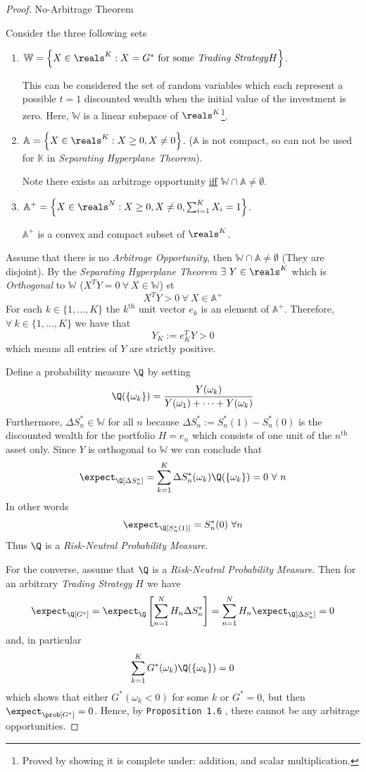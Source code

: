 \documentclass[11pt,a4paper]{article}
\begin{document}
  \begin{proof}{No-Arbitrage Theorem}
    \par Consider the three following sets
    \begin{enumerate}
      \item $\mathbb{W}=\left\{X\in\reals^K:X=G^*\text{ for some \textit{Trading Strategy}}H\right\}$.
      \par This can be considered the set of random variables which each represent a possible $t=1$ discounted wealth when the initial value of the investment is zero. Here, $\mathbb{W}$ is a linear subspace of $\reals^K$\footnote{Proved by showing it is complete under: addition, and scalar multiplication.}.
      \item $\mathbb{A}=\left\{X\in\reals^K:X\geq0,X\neq0\right\}$. ($\mathbb{A}$ is not compact, so can not be used for $\mathbb{K}$ in \textit{Separating Hyperplane Theorem}).
      \par Note there exists an arbitrage opportunity \underline{iff} $\mathbb{W}\cap\mathbb{A}\neq\emptyset$.
      \item $\mathbb{A}^+=\left\{X\in\reals^N:X\geq0,X\neq0,\sum_{i=1}^KX_i=1\right\}$.
      \par $\mathbb{A}^+$ is a convex and compact subset of $\reals^K$.
    \end{enumerate}
    Assume that there is no \textit{Arbitrage Opportunity}, then $\mathbb{W}\cap\mathbb{A}\neq\emptyset$ (They are disjoint). By the \textit{Separating Hyperplane Theorem} $\exists\ Y\in\reals^K$ which is \textit{Orthogonal} to $\mathbb{W}$ ($X^TY=0\ \forall\ X\in\mathbb{W}$) st
    \[ X^TY>0\ \forall\ X\in\mathbb{A}^+ \]
    For each $k\in\{1,\dots,K\}$ the $k^\text{th}$ unit vector $e_k$ is an element of $\mathbb{A}^+$. Therefore, $\forall\ k\in\{1,\dots,K\}$ we have that
    \[ Y_K:=e_K^TY>0 \]
    which means all entries of $Y$ are strictly positive.
    \par Define a probability measure $\Q$ by setting
    \[ \Q(\{\omega_k\})=\frac{Y(\omega_k)}{Y(\omega_1)+\dots+Y(\omega_k)} \]
    Furthermore, $\Delta S_n^*\in\mathbb{W}$ for all $n$ because $\Delta S_n^*:=S_n^*(1)-S_n^*(0)$ is the discounted wealth for the portfolio $H=e_n$ which consists of one unit of the $n^\text{th}$ asset only. Since $Y$ is orthogonal to $\mathbb{W}$ we can conclude that
    \[ \expect_\Q[\Delta S_n^*]=\sum_{k=1}^K\Delta S_n^*(\omega_k)\Q(\{\omega_k\})=0\ \forall\ n \]
    In other words
    \[ \expect_\Q[S_n^*(1)]=S_n^*(0)\ \forall n \]
    Thus $\Q$ is a \textit{Risk-Neutral Probability Measure}.
    \par For the converse, assume that $\Q$ is a \textit{Risk-Neutral Probability Measure}. Then for an arbitrary \textit{Trading Strategy} $H$ we have
    \[ \expect_\Q[G^*]=\expect_\Q\left[\sum_{n=1}^NH_n\Delta S_n^*\right]=\sum_{n=1}^NH_n\expect_\Q[\Delta S_n^*]=0 \]
    and, in particular
    \[ \sum_{k=1}^KG^*(\omega_k)\Q(\{\omega_k\})=0 \]
    which shows that either $G^*(\omega_k<0)$ for some $k$ or $G^*=0$, but then $\expect_\prob[G^*]=0$. Hence, by \texttt{Proposition 1.6} , there cannot be any arbitrage opportunities.\proved
  \end{proof}
\end{document}
